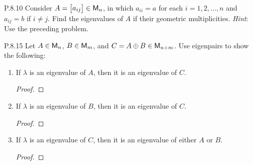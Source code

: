 \documentclass{../homework}
\begin{document}
\begin{problems}
\begin{enumerate}
    \begin{solution}

    \end{solution}
  \end{enumerate}

\item[P.8.10] Consider \(A =
  \begin{bmatrix}
    a_{ij}
  \end{bmatrix}
  \in \mathsf{M}_n\), in which \(a_{ii} = a\) for each \(i = 1, 2, \dots, n\)
  and \(a_{ij} = b\) if \(i \ne j\).  Find the eigenvalues of \(A\) if
  their geometric multiplicities.  \textit{Hint}: Use the preceding
  problem.

  \begin{solution}

  \end{solution}

\item[P.8.15] Let \(A \in \mathsf{M}_n\), \(B \in \mathsf{M}_m\), and
  \(C = A \oplus B \in \mathsf{M}_{n+m}\).  Use eigenpairs to show the
  following:
  \begin{enumerate}
  \item If \(\lambda\) is an eigenvalue of \(A\), then it is an
    eigenvalue of \(C\).

    \begin{solution}
      \begin{proof}

      \end{proof}
    \end{solution}

  \item If \(\lambda\) is an eigenvalue of \(B\), then it is an
    eigenvalue of \(C\).

    \begin{solution}
      \begin{proof}

      \end{proof}
    \end{solution}

  \item If \(\lambda\) is an eigenvalue of \(C\), then it is an
    eigenvalue of either \(A\) or \(B\).

    \begin{solution}
      \begin{proof}

      \end{proof}
    \end{solution}
  \end{enumerate}


\end{problems}
\end{document}
